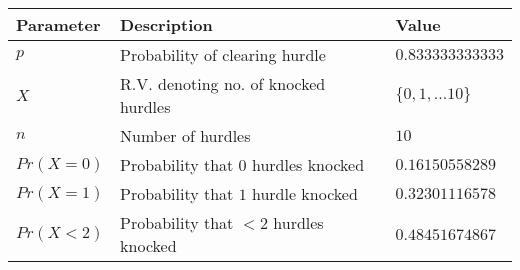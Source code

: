 \begin{tabular}{|l|l|l|}\hline
    Parameter	&Description	&Value\\ \hline
    $p$	&Probability of clearing hurdle	&$0.833333333333$\\ \hline
    $X$	&R.V. denoting no. of knocked hurdles	&$\{0, 1, ... 10\}$\\ \hline
    $n$	&Number of hurdles	&$10$\\ \hline
    $Pr (X = 0)$	&Probability that 0 hurdles knocked	&$0.16150558289$\\ \hline
    $Pr (X = 1)$	&Probability that $1$ hurdle knocked	&$0.32301116578$\\ \hline
    $Pr (X <  2)$	&Probability that $< 2$ hurdles knocked	&$0.48451674867$\\ \hline
\end{tabular}
    
